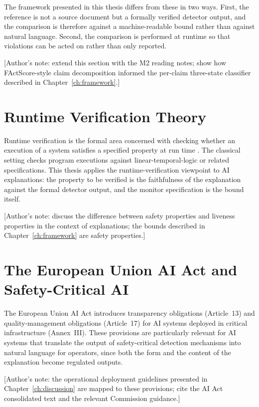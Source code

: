 The framework presented in this thesis differs from these in two ways. First, the
reference is not a source document but a formally verified detector output, and the
comparison is therefore against a machine-readable bound rather than against natural
language. Second, the comparison is performed at runtime so that violations can be
acted on rather than only reported.

[Author's note: extend this section with the M2 reading notes; show how FActScore-style
claim decomposition informed the per-claim three-state classifier described in
Chapter~\ref{ch:framework}.]

\section{Runtime Verification Theory}
\label{sec:related-rv}

Runtime verification is the formal area concerned with checking whether an execution
of a system satisfies a specified property at run time
\autocite{LeuckerSchallhart2009RuntimeVerification}. The classical setting checks
program executions against linear-temporal-logic or related specifications. This
thesis applies the runtime-verification viewpoint to AI explanations: the property to
be verified is the faithfulness of the explanation against the formal detector
output, and the monitor specification is the bound itself.

[Author's note: discuss the difference between safety properties and liveness
properties in the context of explanations; the bounds described in
Chapter~\ref{ch:framework} are safety properties.]

\section{The European Union AI Act and Safety-Critical AI}
\label{sec:related-eu-ai-act}

The European Union AI Act introduces transparency obligations (Article~13) and
quality-management obligations (Article~17) for AI systems deployed in critical
infrastructure (Annex~III). These provisions are particularly relevant for AI systems
that translate the output of safety-critical detection mechanisms into natural
language for operators, since both the form and the content of the explanation become
regulated outputs.

[Author's note: the operational deployment guidelines presented in
Chapter~\ref{ch:discussion} are mapped to these provisions; cite the AI Act consolidated
text and the relevant Commission guidance.]


